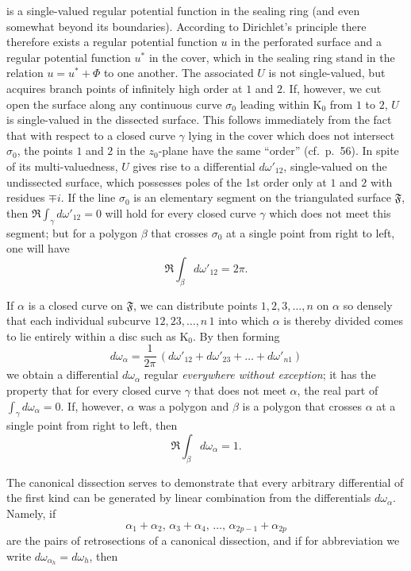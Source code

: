 \documentclass{article}
\begin{document}
is a single-valued regular potential function in the sealing ring (and even somewhat beyond its boundaries). According to Dirichlet's principle there therefore exists a regular potential function $u$ in the perforated surface and a regular potential function $u^*$ in the cover, which in the sealing ring stand in the relation $u = u^* + \Phi$ to one another. The associated $U$ is not single-valued, but acquires branch points of infinitely high order at $1$ and $2$. If, however, we cut open the surface along any continuous curve $\sigma_0$ leading within $\mathrm{K}_0$ from $1$ to $2$, $U$ is single-valued in the dissected surface. This follows immediately from the fact that with respect to a closed curve $\gamma$ lying in the cover which does not intersect $\sigma_0$, the points $1$ and $2$ in the $z_0$-plane have the same ``order'' (cf.\ p.~56). In spite of its multi-valuedness, $U$ gives rise to a differential $d\omega'_{12}$, single-valued on the undissected surface, which possesses poles of the 1st order only at $1$ and $2$ with residues $\mp i$. If the line $\sigma_0$ is an elementary segment on the triangulated surface $\mathfrak{F}$, then $\Re \displaystyle\int_\gamma d\omega'_{12} = 0$ will hold for every closed curve $\gamma$ which does not meet this segment; but for a polygon $\beta$ that crosses $\sigma_0$ at a single point from right to left, one will have
\[ \Re \int_\beta d\omega'_{12} = 2\pi. \]

If $\alpha$ is a closed curve on $\mathfrak{F}$, we can distribute points $1, 2, 3, \dots, n$ on $\alpha$ so densely that each individual subcurve $12, 23, \dots, n\,1$ into which $\alpha$ is thereby divided comes to lie entirely within a disc such as $\mathrm{K}_0$. By then forming
\[ d\omega_\alpha = \frac{1}{2\pi}\,(d\omega'_{12} + d\omega'_{23} + \dots + d\omega'_{n1}) \]
we obtain a differential $d\omega_\alpha$ regular \emph{everywhere without exception}; it has the property that for every closed curve $\gamma$ that does not meet $\alpha$, the real part of $\displaystyle\int_\gamma d\omega_\alpha = 0$. If, however, $\alpha$ was a polygon and $\beta$ is a polygon that crosses $\alpha$ at a single point from right to left, then
\[ \Re \int_\beta d\omega_\alpha = 1. \]

The canonical dissection serves to demonstrate that every arbitrary differential of the first kind can be generated by linear combination from the differentials $d\omega_\alpha$. Namely, if
\[ \alpha_1 + \alpha_2, \, \alpha_3 + \alpha_4, \, \dots, \, \alpha_{2p-1} + \alpha_{2p} \]
are the pairs of retrosections of a canonical dissection, and if for abbreviation we write $d\omega_{\alpha_h} = d\omega_h$, then
\end{document}
